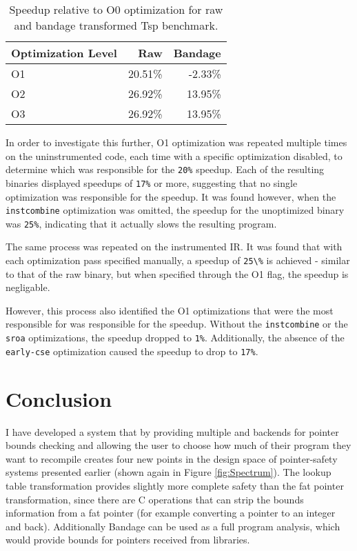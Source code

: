 \begin{table}
\centering
\begin{tabular}{|l|r|r|}
\hline  \textbf{Optimization Level}  &   \textbf{Raw} &   \textbf{Bandage} \\
\hline  O1  &   20.51\%  &   -2.33\%  \\
\hline  O2  &   26.92\%  &   13.95\%  \\
\hline  O3  &   26.92\%  &   13.95\%  \\
\hline
\end{tabular}
\caption{Speedup relative to O0 optimization for raw and bandage transformed Tsp benchmark.}
\label{tab:TspNoChecks}
\end{table}

In order to investigate this further, O1 optimization was repeated multiple times on the uninstrumented code, each time with a specific optimization disabled, to determine which was responsible for the \verb!20%! speedup.
Each of the resulting binaries displayed speedups of \verb!17%! or more, suggesting that no single optimization was responsible for the speedup.
It was found however, when the \verb!instcombine! optimization was omitted, the speedup for the unoptimized binary was \verb!25%!, indicating that it actually slows the resulting program.

The same process was repeated on the instrumented IR.
It was found that with each optimization pass specified manually, a speedup of \verb!25\%! is achieved - similar to that of the raw binary, but when specified through the O1 flag, the speedup is negligable.

However, this process also identified the O1 optimizations that were the most responsible for was responsible for the speedup.
Without the \verb!instcombine! or the \verb!sroa! optimizations, the speedup dropped to \verb!1%!.
Additionally, the absence of the \verb!early-cse! optimization caused the speedup to drop to \verb!17%!.



\section{Conclusion}

I have developed a system that by providing multiple and backends for pointer bounds checking and allowing the user to choose how much of their program they want to recompile creates four new points in the design space of pointer-safety systems presented earlier (shown again in Figure \ref{fig:Spectrum}).
The lookup table transformation provides slightly more complete safety than the fat pointer transformation, since there are C operations that can strip the bounds information from a fat pointer (for example converting a pointer to an integer and back).
Additionally Bandage can be used as a full program analysis, which would provide bounds for pointers received from libraries.

